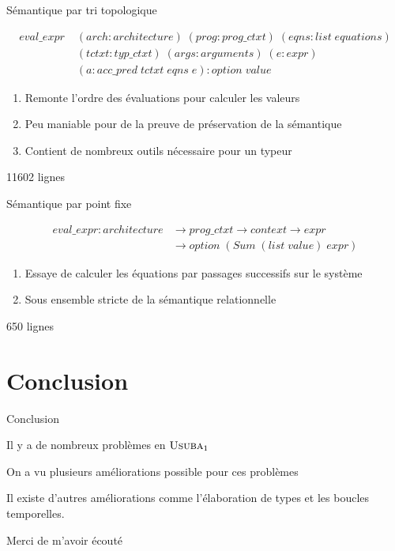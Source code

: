 \documentclass{beamer}
\newcommand{\UsubaA}{$\textsc{Usuba}_1$}
\begin{document}
\begin{frame}{Sémantique par tri topologique}

\begin{align*}
    eval\_expr \; & (arch : architecture) \; (prog : prog\_ctxt) \; (eqns : list \; equations) \\
    & (tctxt : typ\_ctxt) \; (args : arguments) \; (e : expr) \\
    & (a : acc\_pred \; tctxt \; eqns \; e) : option \; value
\end{align*}
 
\begin{enumerate}
\item Remonte l'ordre des évaluations pour calculer les valeurs
\item Peu maniable pour de la preuve de préservation de la sémantique
\item Contient de nombreux outils nécessaire pour un typeur
\end{enumerate}

11602 lignes

\end{frame}

\begin{frame}{Sémantique par point fixe}


\begin{align*}
    eval\_expr : architecture & \rightarrow prog\_ctxt \rightarrow context \rightarrow expr \\
        & \rightarrow option \; (Sum \; (list \; value) \; expr)
\end{align*}


\begin{enumerate}
\item Essaye de calculer les équations par passages successifs sur le système
\item Sous ensemble stricte de la sémantique relationnelle
\end{enumerate}

650 lignes

\end{frame}


\section{Conclusion}

\begin{frame}{Conclusion}

Il y a de nombreux problèmes en \UsubaA{}

On a vu plusieurs améliorations possible pour ces problèmes

Il existe d'autres améliorations comme l'élaboration de types et les boucles temporelles.

\end{frame}

\begin{frame}
Merci de m'avoir écouté
\end{frame}
\end{document}
